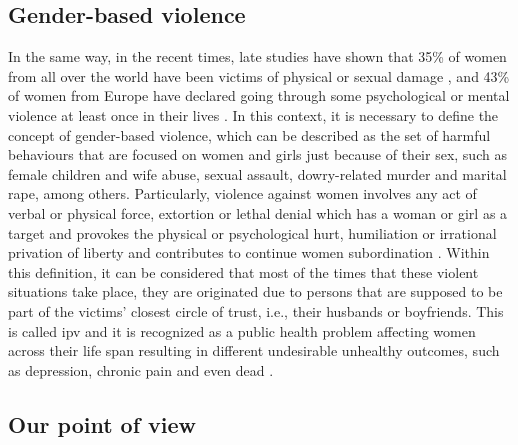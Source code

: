 \subsection{Gender-based violence}

	
	 In the same way, in the recent times, late studies have shown that 35\% of women from all over the world have been victims of physical or sexual damage \cite{WHO2013}, and 43\% of women from Europe have declared going through some psychological or mental violence at least once in their lives \cite{EuropeanUnionAgencyforFundamentalRights2014}. In this context, it is necessary to define the concept of gender-based violence, which can be described as the set of harmful behaviours that are focused on women and girls just because of their sex, such as female children and wife abuse, sexual assault, dowry-related murder and marital rape, among others. Particularly, violence against women involves any act of verbal or physical force, extortion or lethal denial which has a woman or girl as a target and provokes the physical or psychological hurt, humiliation or irrational privation of liberty and contributes to continue women subordination \cite{Heise1999}. Within this definition, it can be considered that most of the times that these violent situations take place, they are originated due to persons that are supposed to be part of the victims' closest circle of trust, i.e., their husbands or boyfriends. This is called \acrfull{ipv} and it is recognized as a public health problem affecting women across their life span resulting in different undesirable unhealthy outcomes, such as depression, chronic pain and even dead \cite{Beyer2015}.
	
\subsection{Our point of view} 
\label{subsection:our-point-of-view}

